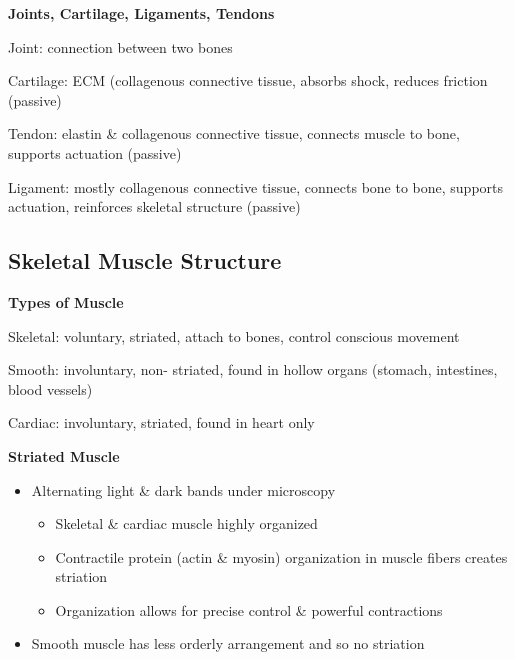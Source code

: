 \documentclass[11pt,fleqn]{book}
\begin{document}
\textbf{Joints, Cartilage, Ligaments, Tendons}
\begin{descriptions}
    \item[Joint: ]connection between two bones
    \item[Cartilage: ]ECM (collagenous connective tissue, absorbs shock, reduces friction (passive)
    \item[Tendon: ]elastin \& collagenous
connective tissue, connects muscle
to bone, supports actuation
(passive) 
    \item[Ligament: ]mostly collagenous
connective tissue, connects bone
to bone, supports actuation,
reinforces skeletal structure
(passive) 
\end{descriptions}

\subsection{Skeletal Muscle Structure}
\textbf{Types of Muscle}
\begin{descriptions}
    \item[Skeletal: ]voluntary, striated,
attach to bones, control
conscious movement
    \item[Smooth: ]involuntary, non-
striated, found in hollow organs
(stomach, intestines, blood
vessels) 
    \item[Cardiac: ]involuntary, striated,
found in heart only
\end{descriptions}

\textbf{Striated Muscle}
\begin{itemize}
    \item Alternating light \& dark bands under microscopy
    \begin{itemize}
        \item Skeletal \& cardiac muscle highly organized
        \item Contractile protein (actin \& myosin) organization in
muscle fibers creates striation
        \item Organization allows for precise control \& powerful
contractions
    \end{itemize}
    \item Smooth muscle has less orderly arrangement and
so no striation
\end{itemize}
\end{document}
